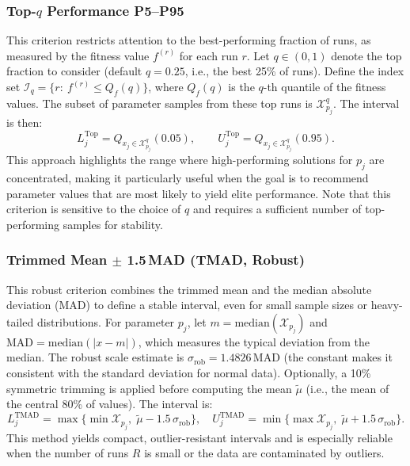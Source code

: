 \documentclass[12pt,a4paper]{article}
\begin{document}
\subsubsection{Top-$q$ Performance P5--P95}
This criterion restricts attention to the best-performing fraction of runs, as measured by the fitness value $f^{(r)}$ for each run $r$. Let $q\in(0,1)$ denote the top fraction to consider (default $q=0.25$, i.e., the best 25\% of runs). Define the index set $\mathcal{I}_q = \{ r:\ f^{(r)} \leq Q_f(q) \}$, where $Q_f(q)$ is the $q$-th quantile of the fitness values. The subset of parameter samples from these top runs is $\mathcal{X}^{q}_{p_j}$. The interval is then:
\begin{equation}
    L^{\text{Top}}_j = Q_{x_j\in\mathcal{X}^{q}_{p_j}}(0.05),\qquad U^{\text{Top}}_j = Q_{x_j\in\mathcal{X}^{q}_{p_j}}(0.95).
\end{equation}
This approach highlights the range where high-performing solutions for $p_j$ are concentrated, making it particularly useful when the goal is to recommend parameter values that are most likely to yield elite performance. Note that this criterion is sensitive to the choice of $q$ and requires a sufficient number of top-performing samples for stability.

\subsubsection{Trimmed Mean $\pm$ 1.5\,MAD (TMAD, Robust)}
This robust criterion combines the trimmed mean and the median absolute deviation (MAD) to define a stable interval, even for small sample sizes or heavy-tailed distributions. For parameter $p_j$, let $m=\mathrm{median}(\mathcal{X}_{p_j})$ and $\mathrm{MAD}=\mathrm{median}(|x-m|)$, which measures the typical deviation from the median. The robust scale estimate is $\sigma_{\text{rob}}=1.4826\,\mathrm{MAD}$ (the constant makes it consistent with the standard deviation for normal data). Optionally, a 10\% symmetric trimming is applied before computing the mean $\tilde\mu$ (i.e., the mean of the central 80\% of values). The interval is:
\begin{equation}
    L^{\text{TMAD}}_j = \max\{\min\mathcal{X}_{p_j},\; \tilde\mu - 1.5\,\sigma_{\text{rob}}\},\quad
    U^{\text{TMAD}}_j = \min\{\max\mathcal{X}_{p_j},\; \tilde\mu + 1.5\,\sigma_{\text{rob}}\}.
\end{equation}
This method yields compact, outlier-resistant intervals and is especially reliable when the number of runs $R$ is small or the data are contaminated by outliers.
\end{document}

